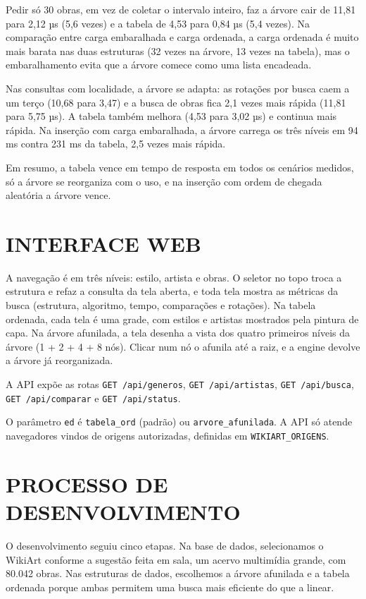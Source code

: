 \documentclass[12pt,a4paper,oneside]{article}
\begin{document}
Pedir só 30 obras, em vez de coletar o intervalo inteiro, faz a árvore cair de 11,81 para 2,12 µs (5,6 vezes) e a tabela de 4,53 para 0,84 µs (5,4 vezes). Na comparação entre carga embaralhada e carga ordenada, a carga ordenada é muito mais barata nas duas estruturas (32 vezes na árvore, 13 vezes na tabela), mas o embaralhamento evita que a árvore comece como uma lista encadeada.

Nas consultas com localidade, a árvore se adapta: as rotações por busca caem a um terço (10,68 para 3,47) e a busca de obras fica 2,1 vezes mais rápida (11,81 para 5,75 µs). A tabela também melhora (4,53 para 3,02 µs) e continua mais rápida. Na inserção com carga embaralhada, a árvore carrega os três níveis em 94 ms contra 231 ms da tabela, 2,5 vezes mais rápida.

Em resumo, a tabela vence em tempo de resposta em todos os cenários medidos, só a árvore se reorganiza com o uso, e na inserção com ordem de chegada aleatória a árvore vence.

\section{\textbf{INTERFACE WEB}}

A navegação é em três níveis: estilo, artista e obras. O seletor no topo troca a estrutura e refaz a consulta da tela aberta, e toda tela mostra as métricas da busca (estrutura, algoritmo, tempo, comparações e rotações). Na tabela ordenada, cada tela é uma grade, com estilos e artistas mostrados pela pintura de capa. Na árvore afunilada, a tela desenha a vista dos quatro primeiros níveis da árvore (1 + 2 + 4 + 8 nós). Clicar num nó o afunila até a raiz, e a engine devolve a árvore já reorganizada.

A API expõe as rotas \texttt{GET /api/generos}, \texttt{GET /api/artistas}, \texttt{GET /api/busca}, \texttt{GET /api/comparar} e \texttt{GET /api/status}.

O parâmetro \texttt{ed} é \texttt{tabela\_ord} (padrão) ou \texttt{arvore\_afunilada}. A API só atende navegadores vindos de origens autorizadas, definidas em \texttt{WIKIART\_ORIGENS}.

\section{\textbf{PROCESSO DE DESENVOLVIMENTO}}

O desenvolvimento seguiu cinco etapas. Na base de dados, selecionamos o WikiArt conforme a sugestão feita em sala, um acervo multimídia grande, com 80.042 obras. Nas estruturas de dados, escolhemos a árvore afunilada e a tabela ordenada porque ambas permitem uma busca mais eficiente do que a linear.
\end{document}
